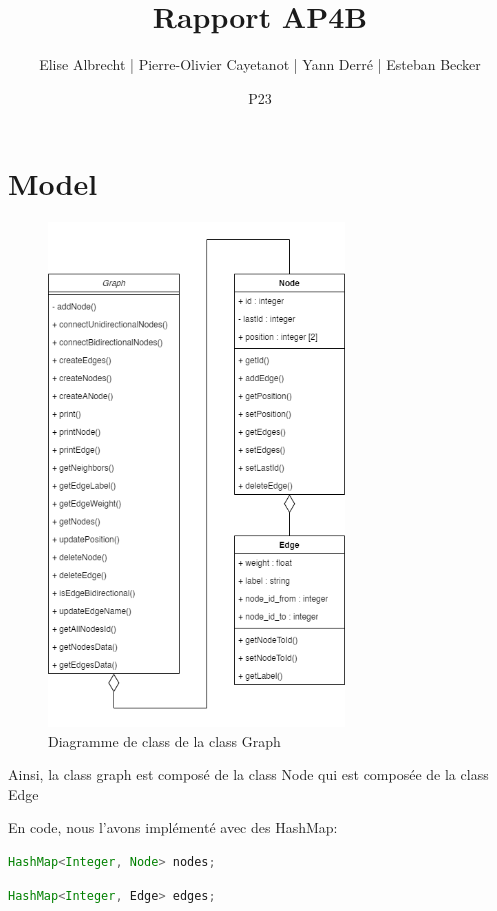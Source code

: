 \documentclass[12pt, titlepage]{article}
\title{Rapport AP4B}
\author{Elise Albrecht | Pierre-Olivier Cayetanot | Yann Derré | Esteban Becker}
\date{P23}
\begin{document}
\maketitle

\section{Model}

\begin{figure}[htp]
\centering
\includegraphics[width=0.7\textwidth]{report/Diagram/classGraph.png}
\caption{Diagramme de class de la class Graph}
\end{figure}

Ainsi, la class graph est composé de la class Node qui est composée de la class Edge

En code, nous l'avons implémenté avec des HashMap:

\begin{lstlisting}[language=java]
HashMap<Integer, Node> nodes;
\end{lstlisting}
\begin{lstlisting}[language=java]
HashMap<Integer, Edge> edges;
\end{lstlisting}
\end{document}
